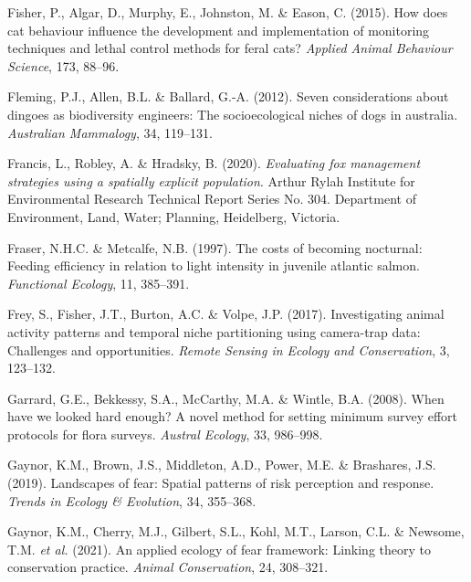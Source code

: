 \documentclass[11pt,a4paper,titlepage,twoside,openright]{style/unimelbthesis}
\begin{document}
\begin{mainmatter}
\leavevmode\hypertarget{ref-fisher2015cat}{}%
Fisher, P., Algar, D., Murphy, E., Johnston, M. \& Eason, C. (2015). How does cat behaviour influence the development and implementation of monitoring techniques and lethal control methods for feral cats? \emph{Applied Animal Behaviour Science}, 173, 88--96.

\leavevmode\hypertarget{ref-fleming2012seven}{}%
Fleming, P.J., Allen, B.L. \& Ballard, G.-A. (2012). Seven considerations about dingoes as biodiversity engineers: The socioecological niches of dogs in australia. \emph{Australian Mammalogy}, 34, 119--131.

\leavevmode\hypertarget{ref-francis2020evaluating}{}%
Francis, L., Robley, A. \& Hradsky, B. (2020). \emph{Evaluating fox management strategies using a spatially explicit population}. Arthur Rylah Institute for Environmental Research Technical Report Series No. 304. Department of Environment, Land, Water; Planning, Heidelberg, Victoria.

\leavevmode\hypertarget{ref-fraser1997costs}{}%
Fraser, N.H.C. \& Metcalfe, N.B. (1997). The costs of becoming nocturnal: Feeding efficiency in relation to light intensity in juvenile atlantic salmon. \emph{Functional Ecology}, 11, 385--391.

\leavevmode\hypertarget{ref-frey2017investigating}{}%
Frey, S., Fisher, J.T., Burton, A.C. \& Volpe, J.P. (2017). Investigating animal activity patterns and temporal niche partitioning using camera-trap data: Challenges and opportunities. \emph{Remote Sensing in Ecology and Conservation}, 3, 123--132.

\leavevmode\hypertarget{ref-https:ux2fux2fdoi.orgux2f10.1111ux2fj.1442-9993.2008.01869.x}{}%
Garrard, G.E., Bekkessy, S.A., McCarthy, M.A. \& Wintle, B.A. (2008). When have we looked hard enough? A novel method for setting minimum survey effort protocols for flora surveys. \emph{Austral Ecology}, 33, 986--998.

\leavevmode\hypertarget{ref-gaynor2019landscapes}{}%
Gaynor, K.M., Brown, J.S., Middleton, A.D., Power, M.E. \& Brashares, J.S. (2019). Landscapes of fear: Spatial patterns of risk perception and response. \emph{Trends in Ecology \& Evolution}, 34, 355--368.

\leavevmode\hypertarget{ref-gaynor2021applied}{}%
Gaynor, K.M., Cherry, M.J., Gilbert, S.L., Kohl, M.T., Larson, C.L. \& Newsome, T.M. \emph{et al.} (2021). An applied ecology of fear framework: Linking theory to conservation practice. \emph{Animal Conservation}, 24, 308--321.


\end{mainmatter}
\end{document}

